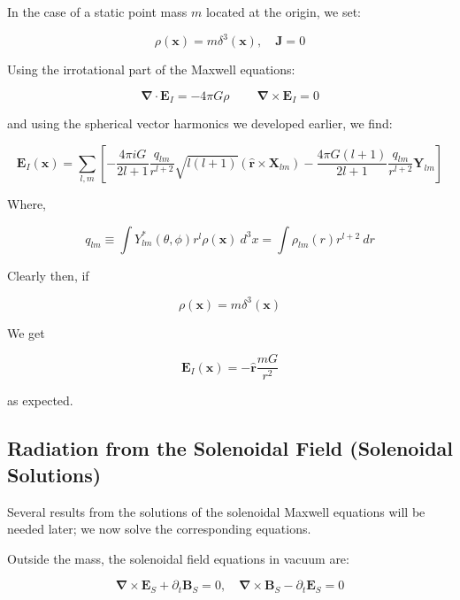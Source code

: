 \documentclass {article}
\renewcommand\vec{\mathbf}
\let\OldS\nabla
\renewcommand{\nabla}{\boldsymbol{\OldS}}
\let\OldHat\hat
\renewcommand{\hat}[1]{\OldHat{\mathbf{#1}}}
\begin{document}
In the case of a static point mass \( m \) located at the origin, we set:

\begin{equation}
\rho(\vec{x}) = m \delta^3(\vec{x}), \quad \vec{J} = 0
\end{equation}


Using the irrotational part of the Maxwell equations:


\begin{equation}
\nabla \cdot \vec{E}_I = -4 \pi G \rho ~~~~~~~~~~ \nabla \times \vec{E}_I = 0
\end{equation}

and using the spherical vector harmonics we developed earlier,  we find:


\begin{equation}
\vec E_I(\vec x) = \sum_{l,m} \left[ -\frac {4\pi i G }{2l+1} \frac {q_{lm}}{r^{l+2}} \sqrt {l(l+1)} \left(\hat r \times \vec X_{lm} \right)  - \frac {4 \pi G (l+1)}{2l+1} \frac {q_{lm}}{r^{l+2}} \vec Y_{lm} \right] 
\end{equation}

Where,

\begin{equation}
q_{lm} \equiv \int Y_{lm}^* (\theta, \phi) r^l  \rho (\vec x) ~ d^3x = \int \rho_{lm} (r) r^{l+2} ~ dr 
\end{equation}

Clearly then, if

\begin{equation}
\rho(\vec{x}) = m \delta^3(\vec{x})
\end{equation}


We get

\begin{equation}
\vec E_I(\vec x) = - \hat{r}\frac {mG} {r^2}
\end{equation}

as expected.



\subsection{Radiation from the Solenoidal Field (Solenoidal Solutions)}

Several results from the solutions of the solenoidal Maxwell equations will be needed later; we now solve the corresponding equations.

Outside the mass, the solenoidal field equations in vacuum are:

\begin{equation}
\nabla \times \vec{E}_S + \partial_t \vec{B}_S = 0, \quad 
\nabla \times \vec{B}_S - \partial_t \vec{E}_S = 0
\end{equation}
\end{document}
